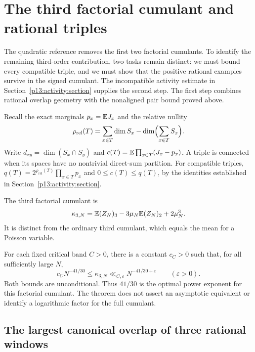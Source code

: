 \section{The third factorial cumulant and rational triples}
\label{p13:third:section}

The quadratic reference removes the first two factorial cumulants.  To
identify the remaining third-order contribution, two tasks remain distinct:
we must bound every compatible triple, and we must show that the positive
rational examples survive in the signed cumulant.  The incompatible
activity estimate in Section~\ref{p13:activity:section} supplies the second
step.  The first step combines rational overlap geometry with the
nonaligned pair bound proved above.

Recall the exact marginals $p_x=\mathbb E J_x$ and the relative nullity
\[
 \rho_{\mathrm{rel}}(T)=\sum_{x\in T}\dim S_x
                    -\dim\Bigl(\sum_{x\in T}S_x\Bigr).
\]
Write $d_{xy}=\dim(S_x\cap S_y)$ and
$c(T)=\mathbb E\prod_{x\in T}(J_x-p_x)$.  A triple is connected when its
spaces have no nontrivial direct-sum partition.  For compatible triples,
$q(T)=2^{\rho_{\mathrm{rel}}(T)}\prod_{x\in T}p_x$ and
$0\leq c(T)\leq q(T)$, by the identities established in
Section~\ref{p13:activity:section}.

The third factorial cumulant is
\begin{equation}
 \kappa_{3,N}=\mathbb E(Z_N)_3-3\mu_N\mathbb E(Z_N)_2+2\mu_N^3.
 \label{p13:third:definition}
\end{equation}
It is distinct from the ordinary third cumulant, which equals the mean
for a Poisson variable.

\begin{theorem}
\label{p13:third:main}
For each fixed critical band $C>0$, there is a constant $c_C>0$ such
that, for all sufficiently large $N$,
\begin{equation}
 c_C N^{-41/30}\leq\kappa_{3,N}
              \ll_{C,\varepsilon}N^{-41/30+\varepsilon}
              \qquad(\varepsilon>0).
 \label{p13:third:two-sided}
\end{equation}
Both bounds are unconditional.  Thus $41/30$ is the optimal power
exponent for this factorial cumulant.  The theorem does not assert an
asymptotic equivalent or identify a logarithmic factor for the full
cumulant.
\end{theorem}

\subsection{The largest canonical overlap of three rational windows}

